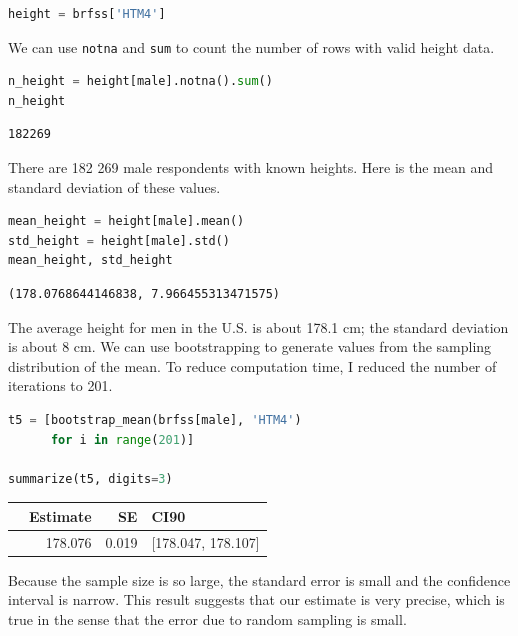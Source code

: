 \begin{lstlisting}[language=Python]
height = brfss['HTM4']
\end{lstlisting}

We can use \passthrough{\lstinline!notna!} and
\passthrough{\lstinline!sum!} to count the number of rows with valid
height data.

\begin{lstlisting}[language=Python]
n_height = height[male].notna().sum()
n_height
\end{lstlisting}

\begin{lstlisting}[]
182269
\end{lstlisting}

There are 182 269 male respondents with known heights. Here is the mean
and standard deviation of these values.

\begin{lstlisting}[language=Python]
mean_height = height[male].mean()
std_height = height[male].std()
mean_height, std_height
\end{lstlisting}

\begin{lstlisting}[]
(178.0768644146838, 7.966455313471575)
\end{lstlisting}

The average height for men in the U.S. is about 178.1 cm; the standard
deviation is about 8 cm. We can use bootstrapping to generate values
from the sampling distribution of the mean. To reduce computation time,
I reduced the number of iterations to 201.

\begin{lstlisting}[language=Python]
t5 = [bootstrap_mean(brfss[male], 'HTM4')
      for i in range(201)]

summarize(t5, digits=3)
\end{lstlisting}

\begin{tabular}{lrrl}
\toprule
{} &  Estimate &     SE &                CI90 \\
\midrule
{} &   178.076 &  0.019 &  [178.047, 178.107] \\
\bottomrule
\end{tabular}

Because the sample size is so large, the standard error is small and the
confidence interval is narrow. This result suggests that our estimate is
very precise, which is true in the sense that the error due to random
sampling is small.

